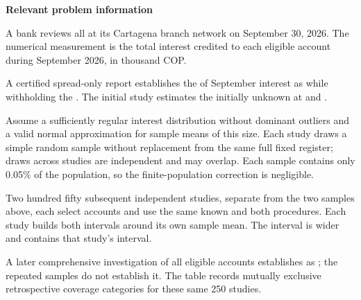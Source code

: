 

\textbf{Relevant problem information}

\begin{probleminfoexcerpt}
A bank reviews all      at its Cartagena branch network on September 30, 2026. The numerical measurement is the total interest credited to each eligible account during September 2026, in thousand COP.
\end{probleminfoexcerpt}

\begin{probleminfoexcerpt}
A certified spread-only report establishes the    of September interest as    while withholding the  . The initial study estimates the initially unknown   at  and  .
\end{probleminfoexcerpt}

\begin{probleminfoexcerpt}
Assume a sufficiently regular interest distribution without dominant outliers and a valid normal approximation for sample means of this size. Each study draws a simple random sample without replacement from the same full fixed register; draws across studies are independent and may overlap. Each sample contains only 0.05\% of the population, so the finite-population correction is negligible.
\end{probleminfoexcerpt}

\begin{probleminfoexcerpt}
Two hundred fifty subsequent independent studies, separate from the two samples above, each select  accounts and use the same known    and both  procedures. Each study builds both intervals around its own sample mean. The  interval is wider and contains that study's  interval.
\end{probleminfoexcerpt}

\begin{probleminfoexcerpt}
A later comprehensive investigation of all eligible accounts establishes    as   ; the repeated samples do not establish it. The table records mutually exclusive retrospective coverage categories for these same 250 studies.
\end{probleminfoexcerpt}

